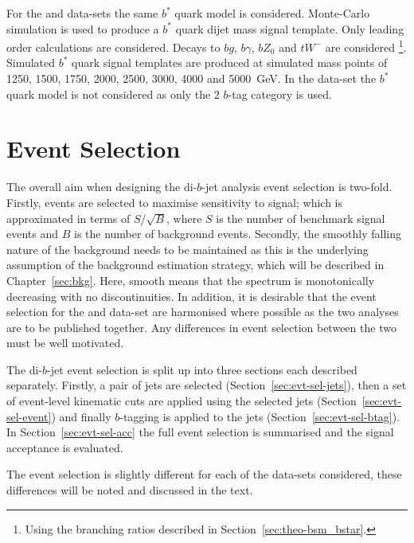 \begin{itemize}[leftmargin=*]
  For the \summer{} and \hm{}
  data-sets the same $b^*$ quark model is considered.
  Monte-Carlo simulation is used to produce a $b^*$ quark dijet mass signal template.
  Only leading order calculations are considered.
  Decays to $bg$, $b\gamma$, $bZ_0$ and $tW^{-}$ are considered
  \footnote{Using the branching ratios described in Section~\ref{sec:theo-bsm_bstar}.}.
  Simulated $b^*$ quark signal templates are produced at simulated mass points of
  1250, 1500, 1750, 2000, 2500, 3000, 4000 and 5000~GeV.
  In the \lm{} data-set the $b^*$ quark model is not considered 
  as only the 2 $b$-tag category is used.
\end{itemize}

\section{Event Selection}
\label{sec:evt-sel}

The overall aim when designing the di-$b$-jet analysis event selection
is two-fold.
Firstly, events are selected to
maximise sensitivity to signal;
which is approximated in terms of $S$/$\sqrt{B}$,
where $S$ is the number of benchmark signal events and $B$ is the number of background events.
Secondly, the smoothly falling nature of the background needs to be maintained
as this is the underlying assumption of the background estimation strategy,
which will be described in Chapter~\ref{sec:bkg}.
Here, smooth means that the spectrum is monotonically decreasing with no discontinuities.
In addition, it is desirable that the event selection for the
\hm{} and \lm{} data-set are
harmonised where possible as the two analyses are to be published together.
Any differences in event selection between the two must be well motivated.

The di-$b$-jet event selection is split up into three sections each described separately.
Firstly, a pair of jets are selected (Section~\ref{sec:evt-sel-jets}),
then a set of event-level kinematic cuts are applied using the selected jets (Section~\ref{sec:evt-sel-event})
and finally $b$-tagging is applied to the jets (Section~\ref{sec:evt-sel-btag}).
In Section~\ref{sec:evt-sel-acc} the full event selection is summarised and
the signal acceptance is evaluated.

The event selection is slightly different for each of the data-sets considered,
these differences will be noted and discussed in the text.


